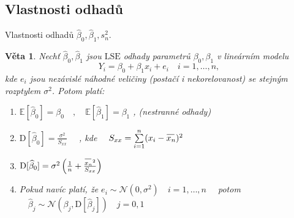 \documentclass[oneside,intlimits,reqno]{scrbook}
\newcommand{\E}{\mathbb{E}} %
\newcommand{\D}{\mathrm{D}} %
\newcommand{\NN}{\mathcal{N}}
\newcommand{\LSE}{\mathrm{LSE}}
\newcommand{\overbar}[1]{\mkern 1mu\overline{\mkern-1mu#1\mkern-3mu}\mkern 3mu}
\newcommand{\oxnn}{\overbar{\rule{0ex}{1.33ex}x_n}}
\newcommand{\sumin}{\sum\limits_{i=1}^{n}}
\theoremstyle{definition}
\theoremstyle{plain}
\newtheorem{theorem}[define]{Věta}
\theoremstyle{remark}
\begin{document}
\subsection{Vlastnosti odhadů}
Vlastnosti odhadů $ \widehat{\beta}_{0} , \widehat{\beta}_{1} ,  s_{n}^{2} $.
\begin{theorem}
   Nechť $ \widehat{\beta}_{0} , \widehat{\beta}_{1} $ jsou $ \LSE $ odhady parametrů $ \beta_{0}, \beta_{1} $ v lineárním modelu 
   \begin{equation}
   		Y_{i} = \beta_{0} + \beta_{1} x_{i} + e_{i} \quad i = 1 , \dots , n ,
   \end{equation}
   kde $ e_{i} $ jsou nezávislé náhodné veličiny (postačí i nekorelovanost) se stejným rozptylem $ \sigma^{2} $. Potom platí:
   \begin{enumerate}
  \item $ \E [ \widehat{\beta}_{0} ] = \beta_{0} \quad , \quad \E [ \widehat{\beta}_{1} ] = \beta_{1} $ , (nestranné odhady)
  \item $  \D [ \widehat{\beta}_{0} ] = \frac{\sigma^{2}}{S_{xx}}  \quad $ , kde $ \quad S_{xx} = \sumin (x_{i} - \oxnn )^{2} $
  \item $ \D [ \widehat{\beta}_{0} ] = \sigma^{2} \left( \frac{1}{n} + \frac{\oxnn ^{2}}{S_{xx}} \right) $
  \item Pokud navíc platí, že $ e_{i} \sim \NN ( 0 , \sigma^{2} ) \quad i = 1 , \dots , n \quad $ potom $ \quad \widehat{\beta}_{j} \sim \NN ( \beta_{j} , \D [ \widehat{\beta}_{j} ] ) \quad j = 0 , 1  $ 
\end{enumerate}
\end{theorem}
\end{document}
